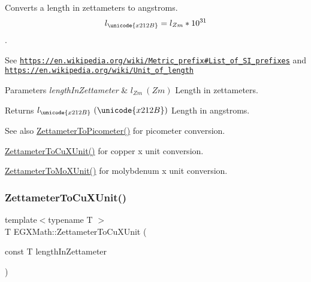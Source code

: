 Converts a length in zettameters to angstroms. \[ l_{\unicode{x212B}}=l_{Zm} * 10^{31} \]. 

See \href{https://en.wikipedia.org/wiki/Metric_prefix#List_of_SI_prefixes}{\tt https\+://en.\+wikipedia.\+org/wiki/\+Metric\+\_\+prefix\#\+List\+\_\+of\+\_\+\+S\+I\+\_\+prefixes} and \href{https://en.wikipedia.org/wiki/Unit_of_length}{\tt https\+://en.\+wikipedia.\+org/wiki/\+Unit\+\_\+of\+\_\+length} 
\begin{DoxyParams}{Parameters}
{\em length\+In\+Zettameter} & $ l_{Zm}\ (Zm)$ Length in zettameters. \\
\hline
\end{DoxyParams}
\begin{DoxyReturn}{Returns}
$ l_{\unicode{x212B}}\ (\unicode{x212B})$ Length in angstroms. 
\end{DoxyReturn}
\begin{DoxySeeAlso}{See also}
\mbox{\hyperlink{group___e_g_x_math-_conversions-_length_conversions-_s_i-_zettameter-_s_i_gae7835234c6727bbfd1e9ad40c54a4740}{Zettameter\+To\+Picometer()}} for picometer conversion. 

\mbox{\hyperlink{group___e_g_x_math-_conversions-_length_conversions-_s_i-_zettameter-_non-_s_i_ga91f2890d91086a45ad9d2b5e7e82b60a}{Zettameter\+To\+Cu\+X\+Unit()}} for copper x unit conversion. 

\mbox{\hyperlink{group___e_g_x_math-_conversions-_length_conversions-_s_i-_zettameter-_non-_s_i_ga10039261b7de3417e69110a56312b9ef}{Zettameter\+To\+Mo\+X\+Unit()}} for molybdenum x unit conversion. 
\end{DoxySeeAlso}
\mbox{\label{group___e_g_x_math-_conversions-_length_conversions-_s_i-_zettameter-_non-_s_i_ga91f2890d91086a45ad9d2b5e7e82b60a}} 
\subsubsection{\texorpdfstring{Zettameter\+To\+Cu\+X\+Unit()}{ZettameterToCuXUnit()}}
{\footnotesize\ttfamily template$<$typename T $>$ \\
T E\+G\+X\+Math\+::\+Zettameter\+To\+Cu\+X\+Unit (\begin{DoxyParamCaption}\item[{const T}]{length\+In\+Zettameter }\end{DoxyParamCaption})}



